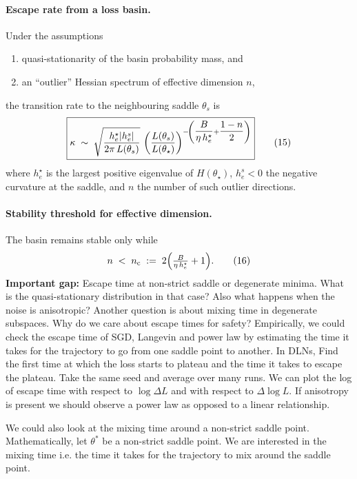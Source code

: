 \documentclass[11pt]{article}
\begin{document}
\paragraph{Escape rate from a loss basin.}

Under the assumptions  
\begin{enumerate}
  \item quasi-stationarity of the basin probability mass, and  
  \item an “outlier” Hessian spectrum of effective dimension $n$,
\end{enumerate}
the transition rate to the neighbouring saddle $\theta_s$ is
\begin{equation}
  \boxed{%
  \kappa\;\sim\;
  \sqrt{\frac{h^{\star}_{e}\lvert h^{s}_{e}\rvert}{2\pi\,L(\theta_s)}}\,
  \left(\frac{L(\theta_s)}{L(\theta_\star)}\right)^{-\!\left(
        \dfrac{B}{\eta\,h^{\star}_{e}}+\dfrac{1-n}{2}\right)}
  }
  \tag{15}
\end{equation}
where $h^{\star}_{e}$ is the largest positive eigenvalue of
$H(\theta_\star)$, $h^{s}_{e}<0$ the negative curvature at the saddle, and
$n$ the number of such outlier directions.

\paragraph{Stability threshold for effective dimension.}

The basin remains stable only while
\begin{equation}
  n
  \;<\;
  n_{\mathrm c}
  \;:=\;
  2\Bigl(\tfrac{B}{\eta\,h^{\star}_{e}}+1\Bigr).
  \tag{16}
\end{equation}
\textbf{Important gap:} Escape time at non-strict saddle or degenerate minima. What is the quasi-stationary distribution in that case? Also what happens when the noise is anisotropic? Another question is about mixing time in degenerate subspaces. Why do we care about escape times for safety?
Empirically, we could check the escape time of SGD, Langevin and power law by estimating the time it takes for the trajectory to go from one saddle point to another. In DLNs, Find the first time at which the loss starts to plateau and the time it takes to escape the plateau. Take the same seed and average over many runs. We can plot the log of escape time with respect to $\log\Delta L$ and with respect to $\Delta \log L$. If anisotropy is present we should observe a power law as opposed to a linear relationship.

We could also look at the mixing time around a non-strict saddle point. Mathematically, let $\theta^*$ be a non-strict saddle point. We are interested in the mixing time i.e. the time it takes for the trajectory to mix around the saddle point.



\end{document}

